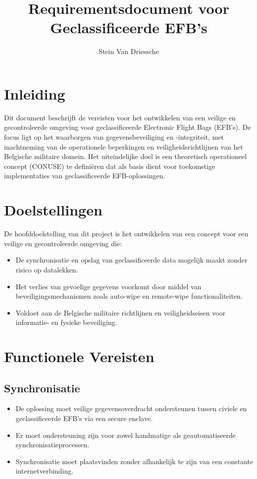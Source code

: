 \documentclass{hogent-article}
\title{Requirementsdocument voor Geclassificeerde EFB's}
\author{Stein Van Driessche}
\begin{document}
    
    \maketitle
    
    \section{Inleiding}
    Dit document beschrijft de vereisten voor het ontwikkelen van een veilige en gecontroleerde omgeving voor geclassificeerde Electronic Flight Bags (EFB's). De focus ligt op het waarborgen van gegevensbeveiliging en -integriteit, met inachtneming van de operationele beperkingen en veiligheidsrichtlijnen van het Belgische militaire domein. Het uiteindelijke doel is een theoretisch operationeel concept (CONUSE) te definiëren dat als basis dient voor toekomstige implementaties van geclassificeerde EFB-oplossingen.
    
    \section{Doelstellingen}
    De hoofddoelstelling van dit project is het ontwikkelen van een concept voor een veilige en gecontroleerde omgeving die:
    \begin{itemize}
        \item De synchronisatie en opslag van geclassificeerde data mogelijk maakt zonder risico op datalekken.
        \item Het verlies van gevoelige gegevens voorkomt door middel van beveiligingsmechanismen zoals auto-wipe en remote-wipe functionaliteiten.
        \item Voldoet aan de Belgische militaire richtlijnen en veiligheidseisen voor informatie- en fysieke beveiliging.
    \end{itemize}
    
    \section{Functionele Vereisten}
    
    \subsection{Synchronisatie}
    \begin{itemize}
        \item De oplossing moet veilige gegevensoverdracht ondersteunen tussen civiele en geclassificeerde EFB's via een secure enclave.
        \item Er moet ondersteuning zijn voor zowel handmatige als geautomatiseerde synchronisatieprocessen.
        \item Synchronisatie moet plaatsvinden zonder afhankelijk te zijn van een constante internetverbinding.
    \end{itemize}
    
\end{document}
